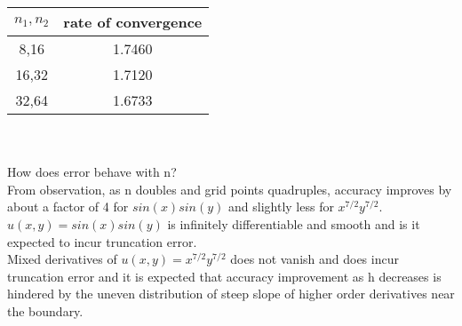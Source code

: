 \documentclass[12pt,letter]{article}
\begin{document}
\begin{enumerate}
    \begin{tabular}{ |c |c |}
      \hline
      $n_1,n_2$ & rate of convergence\\
      \hline
      8,16 & 1.7460\\
      \hline
      16,32 & 1.7120\\
      \hline
      32,64 & 1.6733\\
      \hline
    \end{tabular}\\
    \\
    
    How does error behave with n?\\
    
    From observation, as n doubles and grid points quadruples, accuracy improves by about a factor of 4 for $sin(x)sin(y)$ and slightly less for $x^{7/2}y^{7/2}$.\\
    
    $u(x,y)=sin(x)sin(y)$ is infinitely differentiable and smooth and is it expected to incur truncation error.\\

    Mixed derivatives of $u(x,y)=x^{7/2}y^{7/2}$ does not vanish and does incur truncation error and it is expected that accuracy improvement as h decreases is hindered by the uneven distribution of steep slope of higher order derivatives near the boundary.\\


\end{enumerate}
\end{document}
